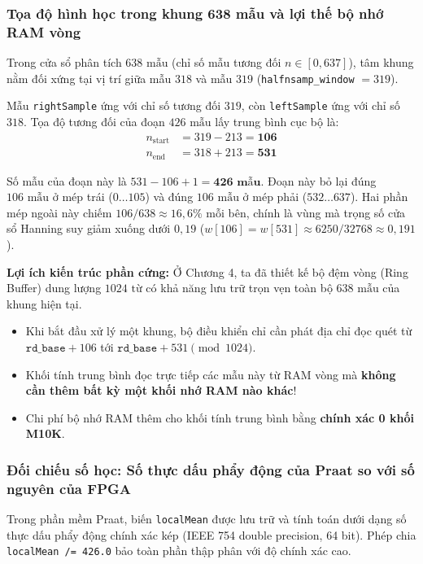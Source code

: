 \subsubsection*{Tọa độ hình học trong khung 638 mẫu và lợi thế bộ nhớ RAM vòng}
Trong cửa sổ phân tích $638\text{ mẫu}$ (chỉ số mẫu tương đối $n \in [0, 637]$), tâm khung nằm đối xứng tại vị trí giữa mẫu $318$ và mẫu $319$ (\texttt{halfnsamp\_window} $= 319$). 

Mẫu \texttt{rightSample} ứng với chỉ số tương đối $319$, còn \texttt{leftSample} ứng với chỉ số $318$. Tọa độ tương đối của đoạn $426\text{ mẫu}$ lấy trung bình cục bộ là:
\begin{align}
n_{\text{start}} &= 319 - 213 = \mathbf{106} \\
n_{\text{end}}   &= 318 + 213 = \mathbf{531}
\end{align}

Số mẫu của đoạn này là $531 - 106 + 1 = \mathbf{426\text{ mẫu}}$. Đoạn này bỏ lại đúng $106\text{ mẫu}$ ở mép trái ($0 \dots 105$) và đúng $106\text{ mẫu}$ ở mép phải ($532 \dots 637$). Hai phần mép ngoài này chiếm $106/638 \approx 16{,}6\%$ mỗi bên, chính là vùng mà trọng số cửa sổ Hanning suy giảm xuống dưới $0{,}19$ ($w[106] = w[531] \approx 6250/32768 \approx 0{,}191$).

\begin{costbox}
\textbf{Lợi ích kiến trúc phần cứng:} Ở Chương 4, ta đã thiết kế bộ đệm vòng (Ring Buffer) dung lượng $1024\text{ từ}$ có khả năng lưu trữ trọn vẹn toàn bộ $638\text{ mẫu}$ của khung hiện tại. 
\begin{itemize}[leftmargin=1.5em, itemsep=2pt]
    \item Khi bắt đầu xử lý một khung, bộ điều khiển chỉ cần phát địa chỉ đọc quét từ $\texttt{rd\_base} + 106$ tới $\texttt{rd\_base} + 531 \pmod{1024}$.
    \item Khối tính trung bình đọc trực tiếp các mẫu này từ RAM vòng mà \textbf{không cần thêm bất kỳ một khối nhớ RAM nào khác}!
    \item Chi phí bộ nhớ RAM thêm cho khối tính trung bình bằng \textbf{chính xác 0 khối M10K}.
\end{itemize}
\end{costbox}

\subsubsection*{Đối chiếu số học: Số thực dấu phẩy động của Praat so với số nguyên của FPGA}
Trong phần mềm Praat, biến \texttt{localMean} được lưu trữ và tính toán dưới dạng số thực dấu phẩy động chính xác kép (IEEE 754 double precision, 64 bit). Phép chia \texttt{localMean /= 426.0} bảo toàn phần thập phân với độ chính xác cao.

